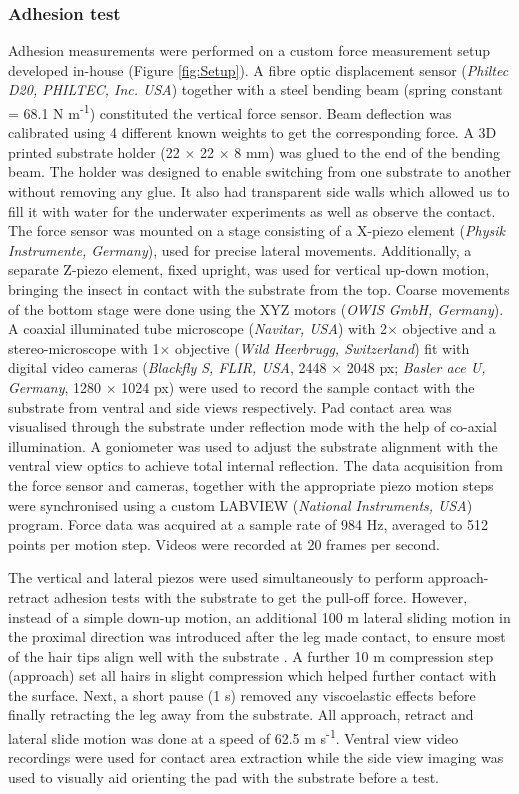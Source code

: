 \documentclass[vruler,JEB]{COB}%
\begin{document}
\subsubsection{Adhesion test}

Adhesion measurements were performed on a custom force measurement
setup developed in-house (Figure \ref{fig:Setup}). A fibre optic
displacement sensor (\emph{Philtec D20, PHILTEC, Inc. USA}) together
with a steel bending beam (spring constant = 68.1 N m\protect\textsuperscript{-1}) constituted
the vertical force sensor. Beam deflection was calibrated using 4
different known weights to get the corresponding force. A
3D printed substrate holder (22 $\times$ 22 $\times$ 8 mm) was glued to the end of the bending beam.
The holder was designed to enable switching from one substrate to
another without removing any glue. It also had transparent side walls
which allowed us to fill it with water for the underwater experiments
as well as observe the contact. The force sensor was mounted on a stage
consisting of a X-piezo element (\emph{Physik Instrumente, Germany}), used for precise lateral movements. Additionally, a separate Z-piezo element, fixed upright,
was used for vertical up-down motion, bringing the insect in contact
with the substrate from the top. Coarse movements of the bottom stage were done using the XYZ motors (\emph{OWIS GmbH, Germany}).
A coaxial illuminated tube microscope
(\emph{Navitar, USA}) with 2$\times$ objective and a stereo-microscope
with 1$\times$ objective (\emph{Wild Heerbrugg, Switzerland}) fit with digital video cameras 
(\emph{Blackfly S, FLIR, USA}, 2448 $\times$ 2048 px; \emph{Basler ace U, Germany}, 1280 $\times$ 1024 px)
were used to record the sample contact with the substrate from ventral
and side views respectively. Pad contact area was visualised through
the substrate under reflection mode with the help of co-axial illumination. A goniometer was used to adjust the substrate alignment
with the ventral view optics to achieve total internal reflection.
The data acquisition from the force sensor and cameras, together with
the appropriate piezo motion steps were synchronised using a custom
LABVIEW (\emph{National Instruments, USA}) program. Force data was acquired at a sample rate of 984 Hz,
averaged to 512 points per motion step. Videos were recorded at 20
frames per second. 

The vertical and lateral piezos were used simultaneously to perform approach-retract
adhesion tests with the substrate to get the pull-off force. However,
instead of a simple down-up motion, an additional 100 \textmu m lateral sliding motion in the proximal direction 
was introduced after the leg made contact, to ensure most of the hair tips align well with the substrate \citep{RN19}.
A further 10 \textmu m compression step (approach) set all hairs in slight compression which helped further contact
with the surface. Next, a short pause (1 s) removed any
viscoelastic effects before finally retracting the leg away from the
substrate. All approach, retract and lateral slide motion was done
at a speed of 62.5 \textmu m s\protect\textsuperscript{-1}. Ventral view video recordings
were used for contact area extraction while the side view imaging
was used to visually aid orienting the pad with the substrate before
a test.
\end{document}
